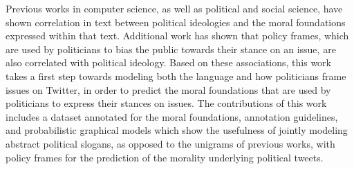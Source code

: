 Previous works in computer science, as well as political and social science, have shown correlation in text between political ideologies and the moral foundations expressed within that text. Additional work has shown that policy frames, which are used by politicians to bias the public towards their stance on an issue, are also correlated with political ideology. Based on these associations, this work takes a first step towards modeling both the language and how politicians frame issues on Twitter, in order to predict the moral foundations that are used by politicians to express their stances on issues. The contributions of this work includes a dataset annotated for the moral foundations, annotation guidelines, and probabilistic graphical models which show the usefulness of jointly modeling abstract political slogans, as opposed to the unigrams of previous works, with policy frames for the prediction of the morality underlying political tweets.
